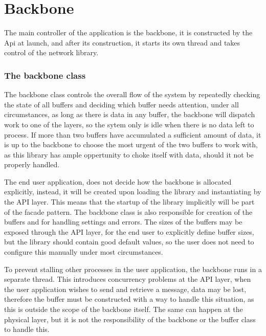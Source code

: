 \chapter{Backbone}
The main controller of the application is the backbone, it is constructed by the Api at launch, and after its construction, it starts its own thread and takes control of the network library.

\subsection{The backbone class}
The backbone class controls the overall flow of the system by repeatedly checking the state of all buffers and deciding which buffer needs attention, under all circumstances, as long as there is data in any buffer, the backbone will dispatch work to one of the layers, so the sytem only is idle when there is no data left to process.
If more than two buffers have accumulated a sufficient amount of data, it is up to the backbone to choose the most urgent of the two buffers to work with, as this library has ample oppertunity to choke itself with data, should it not be properly handled.

The end user application, does not decide how the backbone is allocated explicitly, instead, it will be created upon loading the library and instantiating by the API layer. This means that the startup of the library implicitly will be part of the facade pattern.
The backbone class is also responsible for creation of the buffers and for handling settings and errors. The sizes of the buffers may be exposed through the API layer, for the end user to explicitly define buffer sizes, but the library should contain good default values, so the user does not need to configure this manually under most circumstances.

To prevent stalling other processes in the user application, the backbone runs in a separate thread. This introduces concurrency problems at the API layer, when the user application wishes to send and retrieve a message, data may be lost, therefore the buffer must be constructed with a way to handle this situation, as this is outside the scope of the backbone itself.
The same can happen at the physical layer, but it is not the responsibility of the backbone or the buffer class to handle this.

